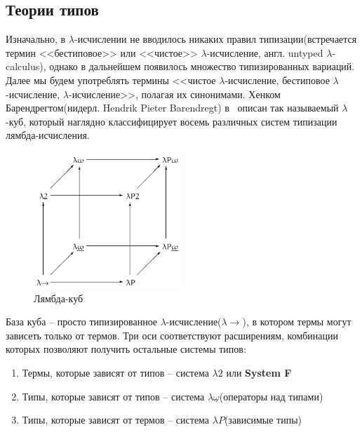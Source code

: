 \subsection{Теории типов}

Изначально, в $\lambda$-исчислении не вводилось никаких правил типизации(встречается термин <<бестиповое>> или <<чистое>> $\lambda$-исчисление, англ. untyped $\lambda$-calculus), однако в дальнейшем появилось множество типизированных вариаций. Далее мы будем употреблять термины <<чистое $\lambda$-исчисление, бестиповое $\lambda$-исчисление, $\lambda$-исчисление>>, полагая их синонимами. Хенком Барендрегтом(нидерл. Hendrik Pieter Barendregt) в~\cite{barendregt1993lambda} описан так называемый $\lambda$-куб, который наглядно классифицирует восемь различных систем типизации лямбда-исчисления.

\begin{figure}[H]
  \centering
  \includegraphics[width=0.5\textwidth]{img/Lambda_cube.png}
  \caption{Лямбда-куб\protect\footnotemark}
\end{figure}


База куба -- просто типизированное $\lambda$-исчисление($\lambda{\to}$), в котором термы могут зависеть только от термов. Три оси соответствуют расширениям, комбинации которых позволяют получить остальные системы типов:

\begin{enumerate}
  \item Термы, которые зависят от типов -- система $\lambda2$ или \textbf{System F}
  \item Типы, которые зависят от типов -- система $\lambda \underline{\omega}$(операторы над типами)
  \item Типы, которые зависят от термов -- система $\lambda P$(зависимые типы)
\end{enumerate}
